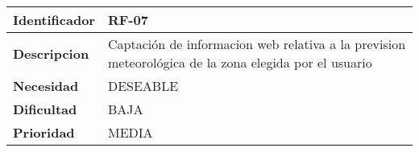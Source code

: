 \begin{center}
    \begin{tabular}{|p{2.6cm}|p{12cm}|}
    \hline
    \textbf{Identificador} & RF-07\\
    \hline
    \textbf{Descripcion} & Captación de informacion web relativa a la prevision meteorológica de la zona elegida por el usuario\\
    \hline
    \textbf{Necesidad} & DESEABLE\\
    \hline
    \textbf{Dificultad} & BAJA\\
    \hline
    \textbf{Prioridad} & MEDIA\\
    \hline
    \end{tabular}
\end{center}
